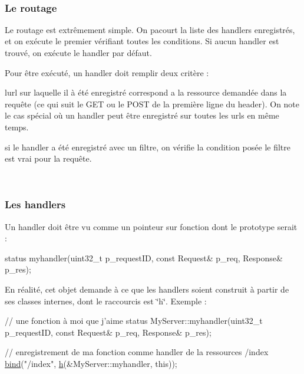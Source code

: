 ~\newline
 \subsubsection*{Le routage }

Le routage est extrêmement simple. On pacourt la liste des handlers enregistrés, et on exécute le premier vérifiant toutes les conditions. Si aucun handler est trouvé, on exécute le handler par défaut.

Pour être exécuté, un handler doit remplir deux critère \+:
\begin{DoxyItemize}
\item l\textquotesingle{}url sur laquelle il à été enregistré correspond a la ressource demandée dans la requête (ce qui suit le G\+ET ou le P\+O\+ST de la première ligne du header). On note le cas spécial où un handler peut être enregistré sur toutes les urls en même temps.
\item si le handler a été enregistré avec un filtre, on vérifie la condition posée le filtre est vrai pour la requête.
\end{DoxyItemize}

~\newline
 \subsubsection*{Les handlers }

Un handler doit être vu comme un pointeur sur fonction dont le prototype serait \+: 
\begin{DoxyCode}
status myhandler(uint32\_t p\_requestID, \textcolor{keyword}{const} Request& p\_req, Response& p\_res);
\end{DoxyCode}


En réalité, cet objet demande à ce que les handlers soient construit à partir de ses classes internes, dont le raccourcis est \char`\"{}h\char`\"{}. Exemple \+: 
\begin{DoxyCode}
\textcolor{comment}{// une fonction à moi que j'aime}
status MyServer::myhandler(uint32\_t p\_requestID, \textcolor{keyword}{const} Request& p\_req, Response& p\_res);

\textcolor{comment}{// enregistrement de ma fonction comme handler de la ressources /index}
\hyperlink{classxtd_1_1network_1_1http_1_1Server_aa964ab0b0c3ba29238cb2aae49181537}{bind}(\textcolor{stringliteral}{"/index"}, \hyperlink{classxtd_1_1network_1_1http_1_1Server_af55090adba952bd4ddcd6eb467974ac8}{h}(&MyServer::myhandler, \textcolor{keyword}{this}));
\end{DoxyCode}



